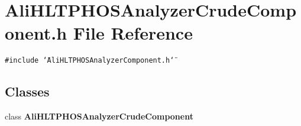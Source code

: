 \section{Ali\-HLTPHOSAnalyzer\-Crude\-Component.h File Reference}
\label{AliHLTPHOSAnalyzerCrudeComponent_8h}
{\tt \#include \char`\"{}Ali\-HLTPHOSAnalyzer\-Component.h\char`\"{}}\par
\subsection*{Classes}
\begin{CompactItemize}
\item 
class {\bf Ali\-HLTPHOSAnalyzer\-Crude\-Component}
\end{CompactItemize}
